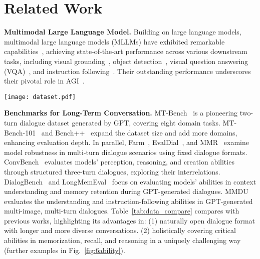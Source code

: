 \section{Related Work}
\vspace{-0.1cm}
\textbf{Multimodal Large Language Model.}
Building on large language models, multimodal large language models (MLLMs) have exhibited remarkable capabilities~\citep{kilmllm,cui2024survey,qin2025survey}, achieving state-of-the-art performance across various downstream tasks, including visual grounding~\citep{li2024groundinggpt,xu2024mc}, object detection~\citep{zang2024contextual,wu2025dettoolchain}, visual question answering (VQA)~\citep{kuang2024natural,xu2024mlevlm,demllms}, and instruction following~\citep{li2023fine,sun2024parrot,wei2024demonstrative}. Their outstanding performance underscores their pivotal role in AGI~\cite{zhang2024improving}.

\begin{figure*}[!t]
 \centering
  \captionsetup{justification=raggedright, singlelinecheck=false}
  \texttt{[image: dataset.pdf]} 
  \vspace{-0.2cm}
  \caption{A sample from the \ours{}, featuring a multi-turn open-ended conversation with six human-annotated questions and answers, designed to assess the ability of MLLMs in open-ended conversations.}
  \vspace{-0.4cm}
  \label{fig:6ability}
\end{figure*}

\noindent \textbf{Benchmarks for Long-Term Conversation.}
MT-Bench~\citep{zheng2023judging} is a pioneering two-turn dialogue dataset generated by GPT, covering eight domain tasks. MT-Bench-101~\citep{bai2024mt} and Bench++~\citep{sun2024parrot} expand the dataset size and add more domains, enhancing evaluation depth. In parallel, Farm~\cite{xu2023earth}, EvalDial~\citep{park2024mitigating}, and MMR~\cite{liu2024seeing} examine model robustness in multi-turn dialogue scenarios using fixed dialogue formats. ConvBench~\citep{liu2024convbench} evaluates models' perception, reasoning, and creation abilities through structured three-turn dialogues, exploring their interrelations. DialogBench~\citep{ou2023dialogbench} and LongMemEval~\citep{wu2024longmemeval} focus on evaluating models' abilities in context understanding and memory retention during GPT-generated dialogues. MMDU~\citep{liu2024mmdu} evaluates the understanding and instruction-following abilities in GPT-generated multi-image, multi-turn dialogues. Table~\ref{tab:data_compare} compares \ours{} with previous works, highlighting its advantages in: (1) naturally open dialogue format with longer and more diverse conversations. (2) holistically covering critical abilities in memorization, recall, and reasoning in a uniquely challenging way (further examples in Fig.~\ref{fig:6ability}).

\vspace{-0.2cm}